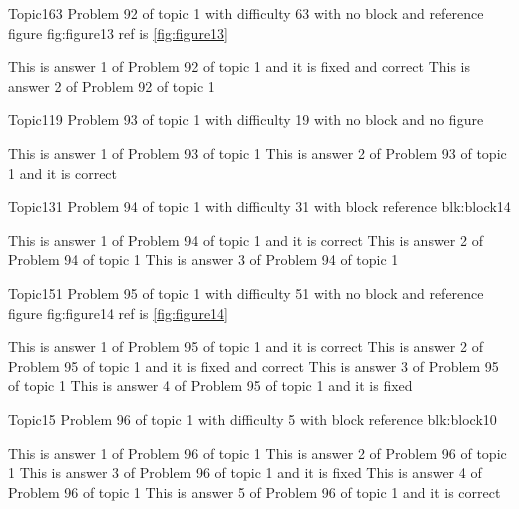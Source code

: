 \documentclass[master]{exam}
\begin{document}
\begin{problem}{Topic1}{63}
	Problem 92 of topic 1 with difficulty 63 with no block and reference figure fig:figure13 ref is \ref{fig:figure13}
	\begin{answers}
		 This is answer 1 of Problem 92 of topic 1 and it is fixed and correct
		\answer This is answer 2 of Problem 92 of topic 1 
	\end{answers}
\end{problem}

\begin{problem}{Topic1}{19}
	Problem 93 of topic 1 with difficulty 19 with no block and no figure
	\begin{answers}
		\answer This is answer 1 of Problem 93 of topic 1 
		\answer[correct] This is answer 2 of Problem 93 of topic 1 and it is correct
	\end{answers}
\end{problem}

\begin{problem}[requires=blk:block14]{Topic1}{31}
	Problem 94 of topic 1 with difficulty 31 with block reference blk:block14
	\begin{answers}
		\answer[correct] This is answer 1 of Problem 94 of topic 1 and it is correct
		\answer This is answer 2 of Problem 94 of topic 1 
		\answer This is answer 3 of Problem 94 of topic 1 
	\end{answers}
\end{problem}

\begin{problem}{Topic1}{51}
	Problem 95 of topic 1 with difficulty 51 with no block and reference figure fig:figure14 ref is \ref{fig:figure14}
	\begin{answers}
		\answer[correct] This is answer 1 of Problem 95 of topic 1 and it is correct
		 This is answer 2 of Problem 95 of topic 1 and it is fixed and correct
		\answer This is answer 3 of Problem 95 of topic 1 
		\answer[fixed] This is answer 4 of Problem 95 of topic 1 and it is fixed
	\end{answers}
\end{problem}

\begin{problem}[requires=blk:block10]{Topic1}{5}
	Problem 96 of topic 1 with difficulty 5 with block reference blk:block10
	\begin{answers}
		\answer This is answer 1 of Problem 96 of topic 1 
		\answer This is answer 2 of Problem 96 of topic 1 
		\answer[fixed] This is answer 3 of Problem 96 of topic 1 and it is fixed
		\answer This is answer 4 of Problem 96 of topic 1 
		\answer[correct] This is answer 5 of Problem 96 of topic 1 and it is correct
	\end{answers}
\end{problem}
\end{document}
